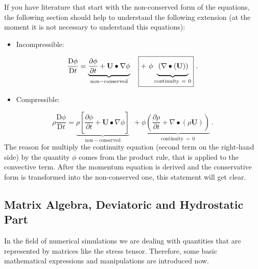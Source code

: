 	If you have literature that start with the non-conserved form of the
    equations, the following section should help to understand the following
    extension (at the moment it is not necessary to understand this equations):
%
%
\begin{itemize}
    \item Incompressible:
\end{itemize}
%
%
\begin{equation}
    \frac{\mathrm{D}\phi}{\mathrm{D}t}
=
    \underbrace
    {
        \frac{\partial \phi}{\partial t}
      + \textbf{U}\bullet \nabla \phi
    }_{\mathrm{non-conserved}}
 ~~~
     \boxed
     { + ~
        \phi
        \underbrace
        {
            \vphantom{\frac{1}{2}}\left( \nabla \bullet (\textbf{U})\right)
        }_{\mathrm{continuity~=~0}}
     } ~.
\end{equation}
%
%
\begin{itemize}
    \item Compressible:
\end{itemize}
%
%
\begin{equation}
   \rho \frac{\mathrm{D}\phi}{\mathrm{D}t}
=
    \underbrace
    {
        \rho\left[\frac{\partial \phi}{\partial t}
      + \textbf{U}\bullet \nabla \phi\right]
    }_{\mathrm{non-conserved}}
 ~~~
    \boxed
    { + ~
        \phi
        \underbrace
        {
            \left( \frac{\partial \rho}{\partial t}
          + \nabla \bullet (\rho \textbf{U})\right)
        }_{\mathrm{continuity~=~0}}
    } ~.
\end{equation}
%
%
	The reason for multiply the continuity equation (second term on the
    right-hand side) by the quantity $\phi$ comes from the product rule,
    that is applied to the convective term. After the momentum equation is
    derived and the conservative form is transformed into the non-conserved
    one, this statement will get clear.
%
%
%
%
\subsection{Matrix Algebra, Deviatoric and Hydrostatic Part}
%
%
	In the field of numerical simulations we are dealing with quantities that
    are represented by matrices like the stress tensor. Therefore, some basic
    mathematical expressions and manipulations are introduced now.


